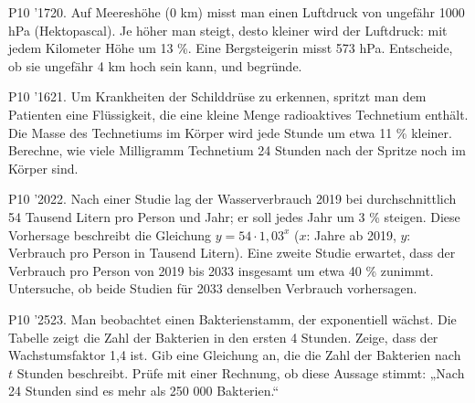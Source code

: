 \documentclass[11pt]{article}
\begin{document}
\pfgruppe{}
\begin{pfaufg}{P10 ’17}{20.}{}
Auf Meereshöhe (0 km) misst man einen Luftdruck von ungefähr 1000 hPa (Hektopascal). Je höher man steigt, desto kleiner wird der Luftdruck: mit jedem Kilometer Höhe um 13 \%. Eine Bergsteigerin misst 573 hPa. Entscheide, ob sie ungefähr 4 km hoch sein kann, und begründe.
\par\smallskip\noindent {}\par
{}
\end{pfaufg}
\pfgruppe{}
\begin{pfaufg}{P10 ’16}{\llap{\textasteriskcentered\,}21.}{}
Um Krankheiten der Schilddrüse zu erkennen, spritzt man dem Patienten eine Flüssigkeit, die eine kleine Menge radioaktives Technetium enthält. Die Masse des Technetiums im Körper wird jede Stunde um etwa 11 \% kleiner. Berechne, wie viele Milligramm Technetium 24 Stunden nach der Spritze noch im Körper sind.
\par\smallskip\noindent {}\par
{}
\end{pfaufg}
\pfgruppe{}
\begin{pfaufg}{P10 ’20}{\llap{\textasteriskcentered\,}22.}{}
Nach einer Studie lag der Wasserverbrauch 2019 bei durchschnittlich 54 Tausend Litern pro Person und Jahr; er soll jedes Jahr um 3 \% steigen. Diese Vorhersage beschreibt die Gleichung $y = 54\cdot 1{,}03^{x}$ ($x$: Jahre ab 2019, $y$: Verbrauch pro Person in Tausend Litern). Eine zweite Studie erwartet, dass der Verbrauch pro Person von 2019 bis 2033 insgesamt um etwa 40 \% zunimmt. Untersuche, ob beide Studien für 2033 denselben Verbrauch vorhersagen.
\end{pfaufg}
\pfgruppe{}
\begin{pfaufg}{P10 ’25}{\llap{\textasteriskcentered\,}23.}{}
Man beobachtet einen Bakterienstamm, der exponentiell wächst. Die Tabelle zeigt die Zahl der Bakterien in den ersten 4 Stunden. Zeige, dass der Wachstumsfaktor 1,4 ist. Gib eine Gleichung an, die die Zahl der Bakterien nach $t$ Stunden beschreibt. Prüfe mit einer Rechnung, ob diese Aussage stimmt: „Nach 24 Stunden sind es mehr als 250 000 Bakterien.“
\par\smallskip\noindent {}\par
{}
\end{pfaufg}
\end{document}
